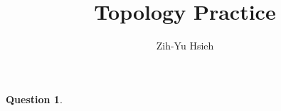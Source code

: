 \documentclass{article}
\title{Topology Practice}
\author{Zih-Yu Hsieh}
\newtheorem{question}{Question}
\begin{document}
\maketitle

\begin{question}
\end{question}
\end{document}

